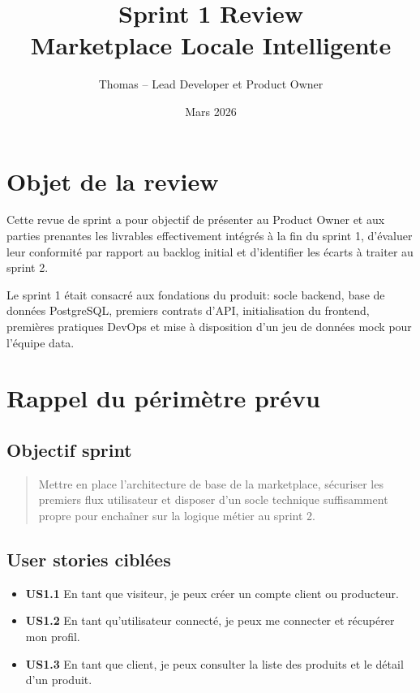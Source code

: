 \documentclass[11pt,a4paper]{article}
\title{Sprint 1 Review\\Marketplace Locale Intelligente}
\author{Thomas -- Lead Developer et Product Owner}
\date{Mars 2026}
\begin{document}
\maketitle

\section{Objet de la review}

Cette revue de sprint a pour objectif de présenter au Product Owner et aux parties prenantes les livrables effectivement intégrés à la fin du sprint 1, d'évaluer leur conformité par rapport au backlog initial et d'identifier les écarts à traiter au sprint 2.

Le sprint 1 était consacré aux fondations du produit: socle backend, base de données PostgreSQL, premiers contrats d'API, initialisation du frontend, premières pratiques DevOps et mise à disposition d'un jeu de données mock pour l'équipe data.

\section{Rappel du périmètre prévu}

\subsection{Objectif sprint}

\begin{quote}
Mettre en place l'architecture de base de la marketplace, sécuriser les premiers flux utilisateur et disposer d'un socle technique suffisamment propre pour enchaîner sur la logique métier au sprint 2.
\end{quote}

\subsection{User stories ciblées}

\begin{itemize}[leftmargin=1.5em]
  \item \textbf{US1.1} En tant que visiteur, je peux créer un compte client ou producteur.
  \item \textbf{US1.2} En tant qu'utilisateur connecté, je peux me connecter et récupérer mon profil.
  \item \textbf{US1.3} En tant que client, je peux consulter la liste des produits et le détail d'un produit.
\end{itemize}
\end{document}
